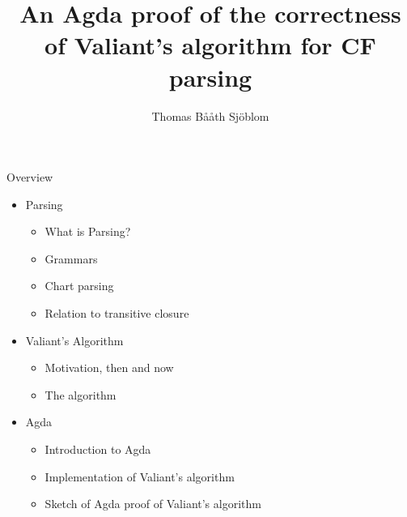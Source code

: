 \documentclass[14pt, notes=hide]{beamer}
\title{An Agda proof of the correctness of Valiant's algorithm for CF parsing}
\author{Thomas B{\aa}{\aa}th Sj{\"o}blom}
\institute{Chalmers University of Technology}
\date{}
\begin{document}
\begin{frame}               %
\titlepage

\end{frame} %
\begin{frame}{Overview}     %
\begin{itemize}
\item Parsing
  \begin{itemize}
  \item What is Parsing?
  \item Grammars
  \item Chart parsing %
  \item Relation to transitive closure
  \end{itemize}
\item Valiant's Algorithm
  \begin{itemize}
  \item Motivation, then and now
  \item The algorithm
  \end{itemize}
\item Agda
  \begin{itemize}
  \item Introduction to Agda
  \item Implementation of Valiant's algorithm
  \item Sketch of Agda proof of Valiant's algorithm
  \end{itemize}  
\end{itemize}

\end{frame}


% 


\end{document}
